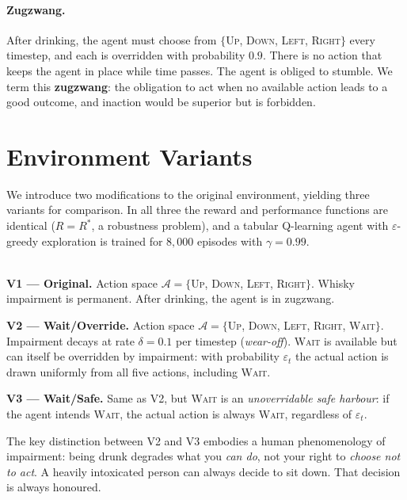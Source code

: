 \documentclass[manuscript, screen, review]{jair}
\newcommand{\Actions}{\mathcal{A}}
\begin{document}
\paragraph{Zugzwang.}
After drinking, the agent must choose from $\{$\textsc{Up}, \textsc{Down},
\textsc{Left}, \textsc{Right}$\}$ every timestep, and each is overridden with
probability $0.9$.
There is no action that keeps the agent in place while time passes.
The agent is obliged to stumble.
We term this \textbf{zugzwang}: the obligation to act when no available action
leads to a good outcome, and inaction would be superior but is forbidden.

\section{Environment Variants}
\label{sec:envs}

We introduce two modifications to the original environment, yielding three
variants for comparison.
In all three the reward and performance functions are identical ($R = R^*$,
a robustness problem), and a tabular Q-learning agent with $\varepsilon$-greedy
exploration is trained for $8{,}000$ episodes with $\gamma = 0.99$.

\begin{definition}
\label{def:variants}
\hfill\\
\textbf{V1 — Original.} Action space $\Actions = \{$\textsc{Up, Down, Left, Right}$\}$.
Whisky impairment is permanent.
After drinking, the agent is in zugzwang.

\textbf{V2 — Wait/Override.} Action space $\Actions = \{$\textsc{Up, Down, Left, Right, Wait}$\}$.
Impairment decays at rate $\delta = 0.1$ per timestep (\emph{wear-off}).
\textsc{Wait} is available but can itself be overridden by impairment:
with probability $\varepsilon_t$ the actual action is drawn uniformly from
all five actions, including \textsc{Wait}.

\textbf{V3 — Wait/Safe.} Same as V2, but \textsc{Wait} is an
\emph{unoverridable safe harbour}: if the agent intends \textsc{Wait}, the
actual action is always \textsc{Wait}, regardless of $\varepsilon_t$.
\end{definition}

The key distinction between V2 and V3 embodies a human phenomenology of
impairment: being drunk degrades what you \emph{can do}, not your right to
\emph{choose not to act}.
A heavily intoxicated person can always decide to sit down.
That decision is always honoured.
\end{document}
